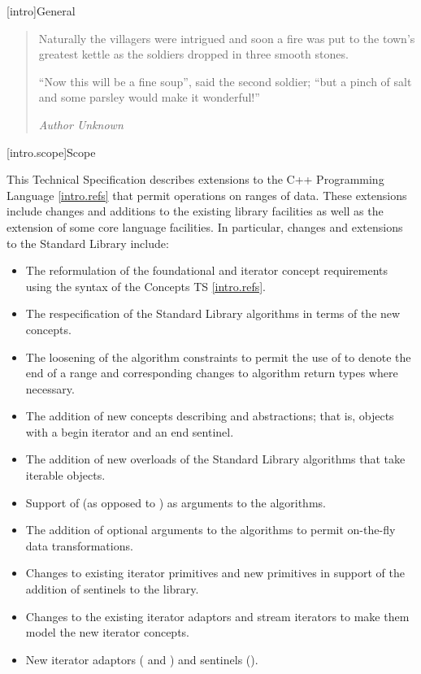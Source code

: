 [intro]{General}

\begin{quote}
Naturally the villagers were intrigued and soon a fire was put to the town's greatest
kettle as the soldiers dropped in three smooth stones.

``Now this will be a fine soup'', said the second soldier;
``but a pinch of salt and some parsley would make it wonderful!''
\begin{flushright}
\textemdash \textit{Author Unknown}
\end{flushright}
\end{quote}

[intro.scope]{Scope}

\pnum
This Technical Specification describes extensions to the C++
Programming Language \ref{intro.refs} that
permit operations on ranges of data. These extensions include
changes and additions to the existing library facilities as well
as the extension of some core language facilities. In particular,
changes and extensions to the Standard Library include:

\begin{itemize}
\item The reformulation of the foundational and iterator concept requirements
using the syntax of the Concepts TS \ref{intro.refs}.
\item The respecification of the Standard Library algorithms in terms of the new
concepts.
\item The loosening of the algorithm constraints to permit the use of
 to denote the end of a range and corresponding changes to algorithm
return types where necessary.
\item The addition of new concepts describing  and 
abstractions; that is, objects with a begin iterator and an end sentinel.
\item The addition of new overloads of the Standard Library algorithms that take iterable
objects.
\item Support of  (as opposed to )
 as arguments to the  algorithms.
\item The addition of optional  arguments to the algorithms to
permit on-the-fly data transformations.
\item Changes to existing iterator primitives and new primitives in support of the
addition of sentinels to the library.
\item Changes to the existing iterator adaptors and stream iterators to make them model
the new iterator concepts.
\item New iterator adaptors ( and ) and
sentinels ().
\end{itemize}

